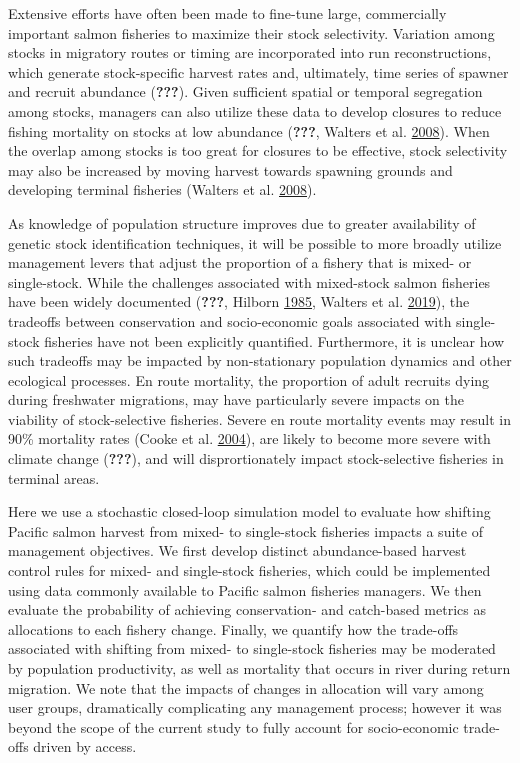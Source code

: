 \documentclass[11pt]{book}
\begin{document}
Extensive efforts have often been made to fine-tune large, commercially important salmon fisheries to maximize their stock selectivity. Variation among stocks in migratory routes or timing are incorporated into run reconstructions, which generate stock-specific harvest rates and, ultimately, time series of spawner and recruit abundance ({\textbf{???}}). Given sufficient spatial or temporal segregation among stocks, managers can also utilize these data to develop closures to reduce fishing mortality on stocks at low abundance ({\textbf{???}}, Walters et al. \protect\hyperlink{ref-Walters2008}{2008}). When the overlap among stocks is too great for closures to be effective, stock selectivity may also be increased by moving harvest towards spawning grounds and developing terminal fisheries (Walters et al. \protect\hyperlink{ref-Walters2008}{2008}).

As knowledge of population structure improves due to greater availability of genetic stock identification techniques, it will be possible to more broadly utilize management levers that adjust the proportion of a fishery that is mixed- or single-stock. While the challenges associated with mixed-stock salmon fisheries have been widely documented ({\textbf{???}}, Hilborn \protect\hyperlink{ref-Hilborn1985}{1985}, Walters et al. \protect\hyperlink{ref-Walters2019}{2019}), the tradeoffs between conservation and socio-economic goals associated with single-stock fisheries have not been explicitly quantified. Furthermore, it is unclear how such tradeoffs may be impacted by non-stationary population dynamics and other ecological processes. En route mortality, the proportion of adult recruits dying during freshwater migrations, may have particularly severe impacts on the viability of stock-selective fisheries. Severe en route mortality events may result in 90\% mortality rates (Cooke et al. \protect\hyperlink{ref-Cooke2004}{2004}), are likely to become more severe with climate change ({\textbf{???}}), and will disprortionately impact stock-selective fisheries in terminal areas.

Here we use a stochastic closed-loop simulation model to evaluate how shifting Pacific salmon harvest from mixed- to single-stock fisheries impacts a suite of management objectives. We first develop distinct abundance-based harvest control rules for mixed- and single-stock fisheries, which could be implemented using data commonly available to Pacific salmon fisheries managers. We then evaluate the probability of achieving conservation- and catch-based metrics as allocations to each fishery change. Finally, we quantify how the trade-offs associated with shifting from mixed- to single-stock fisheries may be moderated by population productivity, as well as mortality that occurs in river during return migration. We note that the impacts of changes in allocation will vary among user groups, dramatically complicating any management process; however it was beyond the scope of the current study to fully account for socio-economic trade-offs driven by access.
\end{document}
